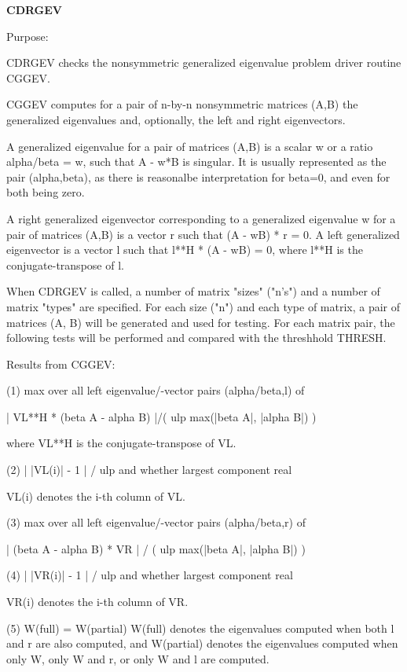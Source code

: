 {\bfseries C\+D\+R\+G\+E\+V} 

\begin{DoxyParagraph}{Purpose\+: }
\begin{DoxyVerb} CDRGEV checks the nonsymmetric generalized eigenvalue problem driver
 routine CGGEV.

 CGGEV computes for a pair of n-by-n nonsymmetric matrices (A,B) the
 generalized eigenvalues and, optionally, the left and right
 eigenvectors.

 A generalized eigenvalue for a pair of matrices (A,B) is a scalar w
 or a ratio  alpha/beta = w, such that A - w*B is singular.  It is
 usually represented as the pair (alpha,beta), as there is reasonalbe
 interpretation for beta=0, and even for both being zero.

 A right generalized eigenvector corresponding to a generalized
 eigenvalue  w  for a pair of matrices (A,B) is a vector r  such that
 (A - wB) * r = 0.  A left generalized eigenvector is a vector l such
 that l**H * (A - wB) = 0, where l**H is the conjugate-transpose of l.

 When CDRGEV is called, a number of matrix "sizes" ("n's") and a
 number of matrix "types" are specified.  For each size ("n")
 and each type of matrix, a pair of matrices (A, B) will be generated
 and used for testing.  For each matrix pair, the following tests
 will be performed and compared with the threshhold THRESH.

 Results from CGGEV:

 (1)  max over all left eigenvalue/-vector pairs (alpha/beta,l) of

      | VL**H * (beta A - alpha B) |/( ulp max(|beta A|, |alpha B|) )

      where VL**H is the conjugate-transpose of VL.

 (2)  | |VL(i)| - 1 | / ulp and whether largest component real

      VL(i) denotes the i-th column of VL.

 (3)  max over all left eigenvalue/-vector pairs (alpha/beta,r) of

      | (beta A - alpha B) * VR | / ( ulp max(|beta A|, |alpha B|) )

 (4)  | |VR(i)| - 1 | / ulp and whether largest component real

      VR(i) denotes the i-th column of VR.

 (5)  W(full) = W(partial)
      W(full) denotes the eigenvalues computed when both l and r
      are also computed, and W(partial) denotes the eigenvalues
      computed when only W, only W and r, or only W and l are
      computed.


\end{DoxyVerb}
\end{DoxyParagraph}
